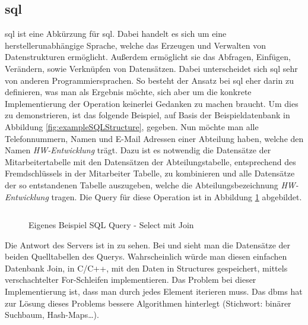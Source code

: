 \subsection{\acs{sql}}\label{subsec:sql}
\acs{sql} ist eine Abkürzung für \acl{sql}. Dabei handelt es sich um eine herstellerunabhängige Sprache, 
welche das Erzeugen und Verwalten von Datenstrukturen ermöglicht. 
Außerdem ermöglicht sie das Abfragen, Einfügen, Verändern, sowie Verknüpfen von Datensätzen.
Dabei unterscheidet sich \ac{sql} sehr von anderen Programmiersprachen.
So besteht der Ansatz bei \ac{sql} eher darin zu definieren, was man als Ergebnis möchte, 
sich aber um die konkrete Implementierung der Operation keinerlei Gedanken zu machen braucht.
Um dies zu demonstrieren, ist das folgende Beispiel, auf Basis der Beispieldatenbank in Abbildung \ref{fig:exampleSQLStructure}, gegeben.
Nun möchte man alle Telefonnummern, Namen und E-Mail Adressen einer Abteilung haben, welche den Namen \emph{HW-Entwicklung} trägt.
Dazu ist es notwendig die Datensätze der Mitarbeitertabelle mit den Datensätzen der Abteilungstabelle, 
entsprechend des Fremdschlüssels in der Mitarbeiter Tabelle, zu kombinieren und alle Datensätze der so entstandenen Tabelle auszugeben, 
welche die Abteilungsbezeichnung \emph{HW-Entwicklung} tragen. 
Die Query für diese Operation ist in Abbildung \ref{fig:exampleSQLQuery} abgebildet.
\begin{figure}[hbt]
  \inputminted{sql}{content/hauptteil/theoretischeGrundlagen/rec/sqlQuery.sql}
  \caption{Eigenes Beispiel SQL Query - Select mit Join}
  \label{fig:exampleSQLQuery}
\end{figure}
Die Antwort des Servers ist in  zu sehen.
Bei  und  sieht man die Datensätze der beiden Quelltabellen des Querys.
Wahrscheinlich würde man diesen einfachen Datenbank Join, in C/C++, mit den Daten in Structures gespeichert, mittels verschachtelter For-Schleifen implementieren. 
Das Problem bei dieser Implementierung ist, dass man durch jedes Element iterieren muss.
Das \ac{dbms} hat zur Lösung dieses Problems bessere Algorithmen hinterlegt (Stichwort: binärer Suchbaum, Hash-Maps\dots).


